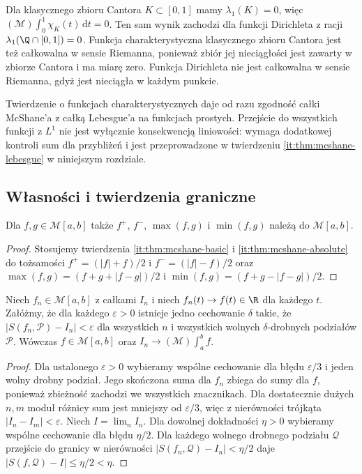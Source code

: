 \begin{przyklad}
Dla klasycznego zbioru Cantora $K\subset[0,1]$ mamy $\lambda_1(K)=0$, więc $(\mathcal M)\int_0^1\chi_K(t)\,\mathrm dt=0$. Ten sam wynik zachodzi dla funkcji Dirichleta z racji $\lambda_1(\Q\cap[0,1])=0$. Funkcja charakterystyczna klasycznego zbioru Cantora jest też całkowalna w sensie Riemanna, ponieważ zbiór jej nieciągłości jest zawarty w zbiorze Cantora i ma miarę zero. Funkcja Dirichleta nie jest całkowalna w sensie Riemanna, gdyż jest nieciągła w każdym punkcie.
\end{przyklad}
\begin{uwaga}
Twierdzenie o funkcjach charakterystycznych daje od razu zgodność całki McShane'a z całką Lebesgue'a na funkcjach prostych. Przejście do wszystkich funkcji z $L^1$ nie jest wyłącznie konsekwencją liniowości: wymaga dodatkowej kontroli sum dla przybliżeń i jest przeprowadzone w twierdzeniu \ref{it:thm:mcshane-lebesgue} w niniejszym rozdziale.
\end{uwaga}

\subsection{Własności i twierdzenia graniczne}
\begin{wniosek}\label{it:cor:mcshane-lattice}
Dla $f,g\in\mathcal M[a,b]$ także $f^+$, $f^-$,
$\max(f,g)$ i $\min(f,g)$ należą do $\mathcal M[a,b]$.
\end{wniosek}
\begin{proof}
Stosujemy twierdzenia \ref{it:thm:mcshane-basic}
i \ref{it:thm:mcshane-absolute} do tożsamości
$f^+=(|f|+f)/2$ i $f^-=(|f|-f)/2$
oraz $\max(f,g)=(f+g+|f-g|)/2$ i
$\min(f,g)=(f+g-|f-g|)/2$.
\end{proof}

\begin{twierdzenie}\label{it:thm:mcshane-equiintegrability}
Niech $f_n\in\mathcal M[a,b]$ z całkami $I_n$ i niech
$f_n(t)\to f(t)\in\R$ dla każdego $t$.
Załóżmy, że dla każdego $\varepsilon>0$ istnieje jedno
cechowanie $\delta$ takie, że $|S(f_n,\mathcal P)-I_n|<\varepsilon$
dla wszystkich $n$ i wszystkich wolnych $\delta$-drobnych
podziałów $\mathcal P$. Wówczas $f\in\mathcal M[a,b]$
oraz $I_n\to(\mathcal M)\int_a^b f$.
\end{twierdzenie}
\begin{proof}
Dla ustalonego $\varepsilon>0$ wybieramy wspólne cechowanie
dla błędu $\varepsilon/3$ i jeden wolny drobny podział.
Jego skończona suma dla $f_n$ zbiega do sumy dla $f$,
ponieważ zbieżność zachodzi we wszystkich znacznikach.
Dla dostatecznie dużych $n,m$ moduł różnicy sum jest
mniejszy od $\varepsilon/3$, więc z nierówności trójkąta
$|I_n-I_m|<\varepsilon$. Niech $I=\lim_n I_n$.
Dla dowolnej dokładności $\eta>0$ wybieramy wspólne
cechowanie dla błędu $\eta/2$. Dla każdego wolnego
drobnego podziału $\mathcal Q$ przejście do granicy
w nierówności $|S(f_n,\mathcal Q)-I_n|<\eta/2$ daje
$|S(f,\mathcal Q)-I|\le\eta/2<\eta$.
\end{proof}

